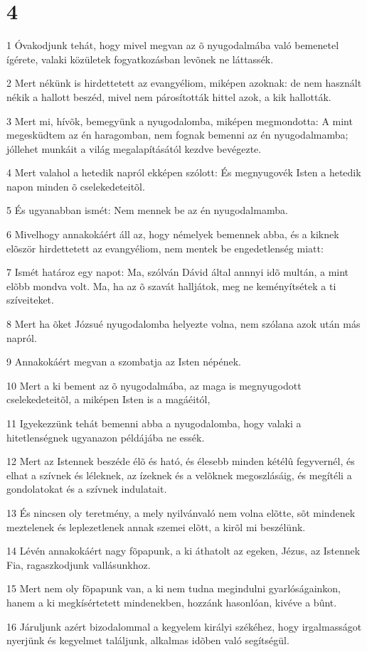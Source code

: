 \chapter{4}

\par 1 Óvakodjunk tehát, hogy mivel megvan az õ nyugodalmába való bemenetel ígérete, valaki közületek fogyatkozásban levõnek ne láttassék.
\par 2 Mert nékünk is hirdettetett az evangyéliom, miképen azoknak: de nem használt nékik a hallott beszéd, mivel nem párosították hittel azok, a kik hallották.
\par 3 Mert mi, hívõk, bemegyünk a nyugodalomba, miképen megmondotta: A mint megesküdtem az én haragomban, nem fognak bemenni az én nyugodalmamba; jóllehet munkáit a világ megalapításától kezdve bevégezte.
\par 4 Mert valahol a hetedik napról ekképen szólott: És megnyugovék Isten a hetedik napon minden õ cselekedeteitõl.
\par 5 És ugyanabban ismét: Nem mennek be az én nyugodalmamba.
\par 6 Mivelhogy annakokáért áll az, hogy némelyek bemennek abba, és a kiknek elõször hirdettetett az evangyéliom, nem mentek be engedetlenség miatt:
\par 7 Ismét határoz egy napot: Ma, szólván Dávid által annnyi idõ multán, a mint elõbb mondva volt. Ma, ha az õ szavát halljátok, meg ne keményítsétek a ti szíveiteket.
\par 8 Mert ha õket Józsué nyugodalomba helyezte volna, nem szólana azok után más napról.
\par 9 Annakokáért megvan a szombatja az Isten népének.
\par 10 Mert a ki bement az õ nyugodalmába, az maga is megnyugodott cselekedeteitõl, a miképen Isten is a magáéitól,
\par 11 Igyekezzünk tehát bemenni abba a nyugodalomba, hogy valaki a hitetlenségnek ugyanazon példájába ne essék.
\par 12 Mert az Istennek beszéde élõ és ható, és élesebb minden kétélû fegyvernél, és elhat a szívnek és léleknek, az ízeknek és a velõknek megoszlásáig, és megítéli a gondolatokat és a szívnek indulatait.
\par 13 És nincsen oly teretmény, a mely nyilvánvaló nem volna elõtte, sõt mindenek meztelenek és leplezetlenek annak szemei elõtt, a kirõl mi beszélünk.
\par 14 Lévén annakokáért nagy fõpapunk, a ki áthatolt az egeken, Jézus, az Istennek Fia,  ragaszkodjunk vallásunkhoz.
\par 15 Mert nem oly fõpapunk van, a ki nem tudna megindulni gyarlóságainkon, hanem a ki megkísértetett mindenekben, hozzánk hasonlóan, kivéve a  bûnt.
\par 16 Járuljunk azért bizodalommal a kegyelem királyi székéhez, hogy irgalmasságot nyerjünk és kegyelmet találjunk, alkalmas idõben való segítségül.

